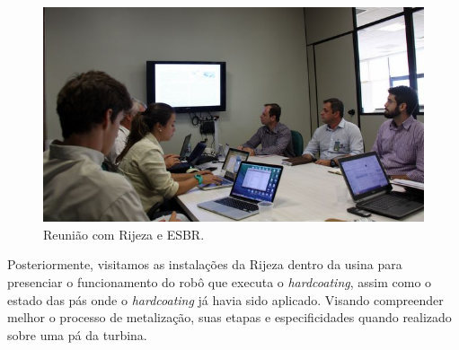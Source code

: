 \documentclass[a4paper,11pt,oneside,openany,brazilian,version=last,draft=false,]{main}
\begin{document}
\begin{twocolumn}
\begin{figure}[H]
\centering
\includegraphics[width=\columnwidth]{Fotos/img_4836.jpg}
\caption{Reunião com Rijeza e ESBR.}
\label{fig:gull}
\end{figure}


Posteriormente, visitamos as instala\-ções da Rijeza dentro da usina para
presenciar o funcionamento do robô que executa o \textit{hardcoating}, assim como o
estado das pás onde o \textit{hardcoating} já havia sido aplicado. Visando compreender
melhor o processo de metalização, suas etapas e especificidades quando realizado
sobre uma pá da turbina.


\end{twocolumn}
\end{document}
